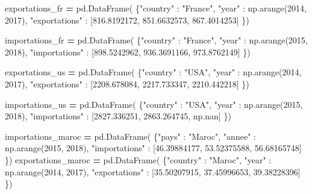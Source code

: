\documentclass[
  12pt,
]{book}
\newenvironment{Shaded}{\begin{snugshade}}{\end{snugshade}}
\newcommand{\DecValTok}[1]{\textcolor[rgb]{0.00,0.00,0.81}{#1}}
\newcommand{\FloatTok}[1]{\textcolor[rgb]{0.00,0.00,0.81}{#1}}
\newcommand{\NormalTok}[1]{#1}
\newcommand{\OperatorTok}[1]{\textcolor[rgb]{0.81,0.36,0.00}{\textbf{#1}}}
\newcommand{\StringTok}[1]{\textcolor[rgb]{0.31,0.60,0.02}{#1}}
\numberwithin{equation}{section}
\numberwithin{countremarque}{section}
\begin{document}
\begin{Shaded}
\begin{Highlighting}[]
\NormalTok{exportations\_fr }\OperatorTok{=}\NormalTok{ pd.DataFrame(}
\NormalTok{    \{}\StringTok{"country"}\NormalTok{ : }\StringTok{"France"}\NormalTok{,}
     \StringTok{"year"}\NormalTok{ : np.arange(}\DecValTok{2014}\NormalTok{, }\DecValTok{2017}\NormalTok{),}
     \StringTok{"exportations"}\NormalTok{ : [}\FloatTok{816.8192172}\NormalTok{, }\FloatTok{851.6632573}\NormalTok{, }\FloatTok{867.4014253}\NormalTok{]}
\NormalTok{    \})}

\NormalTok{importations\_fr }\OperatorTok{=}\NormalTok{ pd.DataFrame(}
\NormalTok{    \{}\StringTok{"country"}\NormalTok{ : }\StringTok{"France"}\NormalTok{,}
     \StringTok{"year"}\NormalTok{ : np.arange(}\DecValTok{2015}\NormalTok{, }\DecValTok{2018}\NormalTok{),}
     \StringTok{"importations"}\NormalTok{ : [}\FloatTok{898.5242962}\NormalTok{, }\FloatTok{936.3691166}\NormalTok{, }\FloatTok{973.8762149}\NormalTok{]}
\NormalTok{    \})}

\NormalTok{exportations\_us }\OperatorTok{=}\NormalTok{ pd.DataFrame(}
\NormalTok{    \{}\StringTok{"country"}\NormalTok{ : }\StringTok{"USA"}\NormalTok{,}
     \StringTok{"year"}\NormalTok{ : np.arange(}\DecValTok{2014}\NormalTok{, }\DecValTok{2017}\NormalTok{),}
     \StringTok{"exportations"}\NormalTok{ : [}\FloatTok{2208.678084}\NormalTok{, }\FloatTok{2217.733347}\NormalTok{, }\FloatTok{2210.442218}\NormalTok{]}
\NormalTok{    \})}

\NormalTok{importations\_us }\OperatorTok{=}\NormalTok{ pd.DataFrame(}
\NormalTok{    \{}\StringTok{"country"}\NormalTok{ : }\StringTok{"USA"}\NormalTok{,}
     \StringTok{"year"}\NormalTok{ : np.arange(}\DecValTok{2015}\NormalTok{, }\DecValTok{2018}\NormalTok{),}
     \StringTok{"importations"}\NormalTok{ : [}\FloatTok{2827.336251}\NormalTok{, }\FloatTok{2863.264745}\NormalTok{, np.nan]}
\NormalTok{    \})}

\NormalTok{importations\_maroc }\OperatorTok{=}\NormalTok{ pd.DataFrame(}
\NormalTok{    \{}\StringTok{"pays"}\NormalTok{ : }\StringTok{"Maroc"}\NormalTok{,}
     \StringTok{"annee"}\NormalTok{ : np.arange(}\DecValTok{2015}\NormalTok{, }\DecValTok{2018}\NormalTok{),}
     \StringTok{"importations"}\NormalTok{ : [}\FloatTok{46.39884177}\NormalTok{, }\FloatTok{53.52375588}\NormalTok{, }\FloatTok{56.68165748}\NormalTok{]}
\NormalTok{    \})}
\NormalTok{exportations\_maroc }\OperatorTok{=}\NormalTok{ pd.DataFrame(}
\NormalTok{    \{}\StringTok{"country"}\NormalTok{ : }\StringTok{"Maroc"}\NormalTok{,}
     \StringTok{"year"}\NormalTok{ : np.arange(}\DecValTok{2014}\NormalTok{, }\DecValTok{2017}\NormalTok{),}
     \StringTok{"exportations"}\NormalTok{ : [}\FloatTok{35.50207915}\NormalTok{, }\FloatTok{37.45996653}\NormalTok{, }\FloatTok{39.38228396}\NormalTok{]}
\NormalTok{    \})}


\end{Highlighting}
\end{Shaded}
\end{document}
